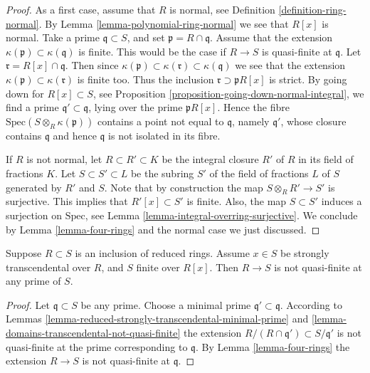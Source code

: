 \begin{proof}
As a first case, assume that $R$ is normal, see
Definition \ref{definition-ring-normal}.
By Lemma \ref{lemma-polynomial-ring-normal}
we see that $R[x]$ is normal.
Take a prime $\mathfrak q \subset S$,
and set $\mathfrak p = R \cap \mathfrak q$.
Assume that the extension $\kappa(\mathfrak p)
\subset \kappa(\mathfrak q)$ is finite.
This would be the case if $R \to S$ is
quasi-finite at $\mathfrak q$.
Let $\mathfrak r = R[x] \cap \mathfrak q$.
Then since $\kappa(\mathfrak p)
\subset \kappa(\mathfrak r) \subset \kappa(\mathfrak q)$
we see that the extension $\kappa(\mathfrak p)
\subset \kappa(\mathfrak r)$ is finite too.
Thus the inclusion $\mathfrak r \supset \mathfrak p R[x]$
is strict. By going down for $R[x] \subset S$,
see Proposition \ref{proposition-going-down-normal-integral},
we find a prime $\mathfrak q' \subset \mathfrak q$,
lying over the prime $\mathfrak pR[x]$. Hence
the fibre $\text{Spec}(S \otimes_R \kappa(\mathfrak p))$
contains a point not equal to $\mathfrak q$,
namely $\mathfrak q'$, whose closure contains $\mathfrak q$ and hence
$\mathfrak q$ is not isolated in its fibre.

\medskip\noindent
If $R$ is not normal, let $R \subset R' \subset K$ be
the integral closure $R'$ of $R$ in its field of fractions
$K$. Let $S \subset S' \subset L$ be the subring $S'$ of
the field of fractions $L$ of $S$ generated by $R'$ and
$S$. Note that by construction the map $S \otimes_R R'
\to S'$ is surjective. This implies that $R'[x] \subset S'$
is finite. Also, the map $S \subset S'$
induces a surjection on $\text{Spec}$, see
Lemma \ref{lemma-integral-overring-surjective}.
We conclude by Lemma \ref{lemma-four-rings} and the normal case
we just discussed.
\end{proof}

\begin{lemma}
\label{lemma-reduced-strongly-transcendental-not-quasi-finite}
Suppose $R \subset S$ is an inclusion of reduced rings.
Assume $x \in S$ be strongly transcendental over $R$,
and $S$ finite over $R[x]$. Then $R\to S$ is not
quasi-finite at any prime of $S$.
\end{lemma}

\begin{proof}
Let $\mathfrak q \subset S$ be any prime.
Choose a minimal prime $\mathfrak q' \subset \mathfrak q$.
According to Lemmas
\ref{lemma-reduced-strongly-transcendental-minimal-prime} and
\ref{lemma-domains-transcendental-not-quasi-finite}
the extension $R/(R \cap \mathfrak q') \subset
S/\mathfrak q'$ is not quasi-finite at the prime corresponding
to $\mathfrak q$. By Lemma \ref{lemma-four-rings}
the extension $R \to S$ is not quasi-finite
at $\mathfrak q$.
\end{proof}


